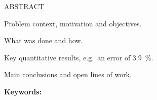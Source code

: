\begin{resumenproyecto}{ABSTRACT}
\begin{otherlanguage}{english}

Problem context, motivation and objectives.

What was done and how.

Key quantitative results, e.g.\ an error of \qty{3.9}{\percent}.

Main conclusions and open lines of work.

\vspace{1em}
\noindent\textbf{Keywords:} \Keywords

\end{otherlanguage}
\end{resumenproyecto}

